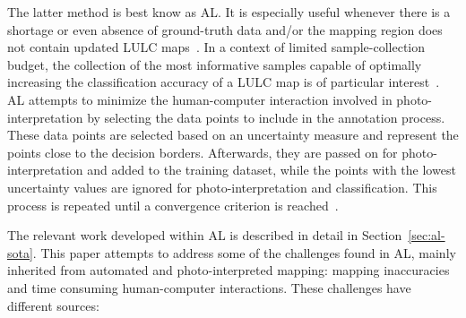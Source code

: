 \documentclass[remotesensing,article,submit,moreauthors,pdftex]{Definitions/mdpi}
\begin{document}
The latter method is best know as AL\@. It is especially useful whenever there
is a shortage or even absence of ground-truth data and/or the mapping region
does not contain updated LULC maps~\cite{Su2020}. In a context of limited
sample-collection budget, the collection of the most informative samples
capable of optimally increasing the classification accuracy of a LULC map is
of particular interest~\cite{Su2020}. AL attempts to minimize the
human-computer interaction involved in photo-interpretation by selecting the
data points to include in the annotation process. These data points are
selected based on an uncertainty measure and represent the points close to the
decision borders. Afterwards, they are passed on for photo-interpretation and
added to the training dataset, while the points with the lowest uncertainty
values are ignored for photo-interpretation and classification. This process
is repeated until a convergence criterion is reached~\cite{Pasolli2016}. 

The relevant work developed within AL is described in detail in
Section~\ref{sec:al-sota}. This paper attempts to address some of the
challenges found in AL, mainly inherited from automated and photo-interpreted
mapping: mapping inaccuracies and time consuming human-computer interactions.
These challenges have different sources:
\end{document}

